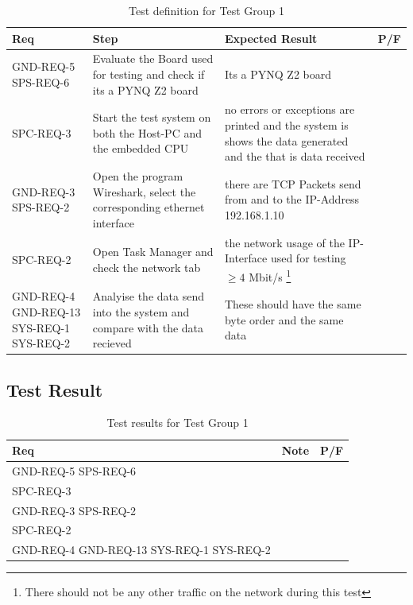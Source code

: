 \begin{table}[H]
	\begin{tabular}{|p{2.7cm}|p{6cm}|p{6cm}|p{1cm}|}
		\hline
		\textbf{Req} & \textbf{Step} & \textbf{Expected Result} & \textbf{P/F}\\
		\hline
		GND-REQ-5 SPS-REQ-6 & Evaluate the Board used for testing and check if its a PYNQ Z2 board & Its a PYNQ Z2 board& \\
		\hline
		SPC-REQ-3 & Start the test system on both the Host-PC and the embedded CPU & no errors or exceptions are printed and the system is shows the data generated and the that is data received & \\
		\hline
		GND-REQ-3 SPS-REQ-2 & Open the program Wireshark, select the corresponding ethernet interface & there are TCP Packets send from and to the IP-Address 192.168.1.10 & \\
		\hline
		SPC-REQ-2 & Open Task Manager and check the network tab & the network usage of the IP-Interface used for testing $\geq  4$ Mbit/s \footnote{There should not be any other traffic on the network during this test} & \\
		\hline
		GND-REQ-4 GND-REQ-13 SYS-REQ-1 SYS-REQ-2 & Analyise the data send into the system and compare with the data recieved & These should have the same byte order and the same data& \\
		\hline
		
	\end{tabular}
	\caption{Test definition for Test Group 1}
	\label{tab:TestGroup1_testdef}
\end{table}

\subsection{Test Result}

\begin{table}[H]
	\begin{tabular}{|p{2.7cm}|p{12.4cm}|p{1cm}|}
		\hline
		\textbf{Req} & \textbf{Note} & \textbf{P/F}\\
		\hline
		GND-REQ-5 SPS-REQ-6 & & \\
		\hline
		SPC-REQ-3 &  & \\
		\hline
		GND-REQ-3 SPS-REQ-2 &  & \\
		\hline
		SPC-REQ-2 &  & \\
		\hline
		GND-REQ-4 GND-REQ-13 SYS-REQ-1 SYS-REQ-2 &  & \\
		\hline
		
	\end{tabular}
	\caption{Test results for Test Group 1}
	\label{tab:TestGroup1_testresults}
\end{table}


